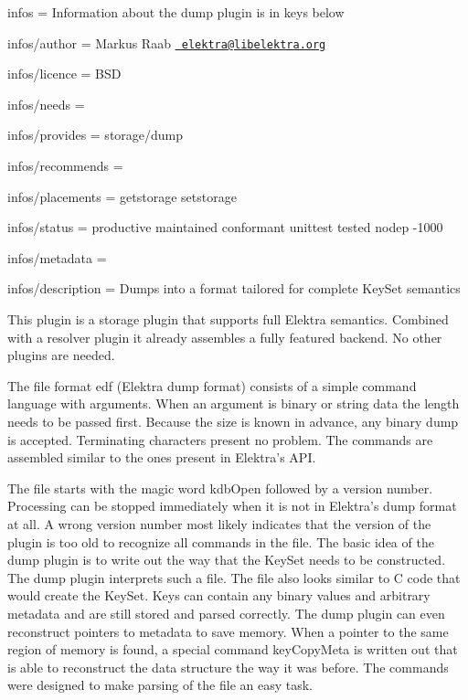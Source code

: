 
\begin{DoxyItemize}
\item infos = Information about the dump plugin is in keys below
\item infos/author = Markus Raab \href{mailto:elektra@libelektra.org}{\texttt{ elektra@libelektra.\+org}}
\item infos/licence = B\+SD
\item infos/needs =
\item infos/provides = storage/dump
\item infos/recommends =
\item infos/placements = getstorage setstorage
\item infos/status = productive maintained conformant unittest tested nodep -\/1000
\item infos/metadata =
\item infos/description = Dumps into a format tailored for complete Key\+Set semantics
\end{DoxyItemize}

This plugin is a storage plugin that supports full Elektra semantics. Combined with a resolver plugin it already assembles a fully featured backend. No other plugins are needed.

The file format edf (Elektra dump format) consists of a simple command language with arguments. When an argument is binary or string data the length needs to be passed first. Because the size is known in advance, any binary dump is accepted. Terminating characters present no problem. The commands are assembled similar to the ones present in Elektra’s A\+PI.

The file starts with the magic word {\ttfamily kdb\+Open} followed by a version number. Processing can be stopped immediately when it is not in Elektra’s dump format at all. A wrong version number most likely indicates that the version of the plugin is too old to recognize all commands in the file. The basic idea of the dump plugin is to write out the way that the Key\+Set needs to be constructed. The dump plugin interprets such a file. The file also looks similar to C code that would create the Key\+Set. Keys can contain any binary values and arbitrary metadata and are still stored and parsed correctly. The dump plugin can even reconstruct pointers to metadata to save memory. When a pointer to the same region of memory is found, a special command {\ttfamily key\+Copy\+Meta} is written out that is able to reconstruct the data structure the way it was before. The commands were designed to make parsing of the file an easy task.


